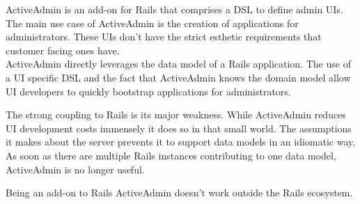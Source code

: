 ActiveAdmin is an add-on for Rails that comprises a DSL to define admin UIs. The main use case of ActiveAdmin is the creation of applications for administrators. These UIs don't have the strict esthetic requirements that customer facing ones have. \\ ActiveAdmin directly leverages the data model of a Rails application. The use of a UI specific DSL and the fact that ActiveAdmin knows the domain model allow UI developers to quickly bootstrap applications for administrators.

The strong coupling to Rails is its major weakness. While ActiveAdmin reduces UI development costs immensely it does so in that small world. The assumptions it makes about the server prevents it to support data models in an idiomatic way. As soon as there are multiple Rails instances contributing to one data model, ActiveAdmin is no longer useful.

Being an add-on to Rails ActiveAdmin doesn't work outside the Rails ecosystem.
